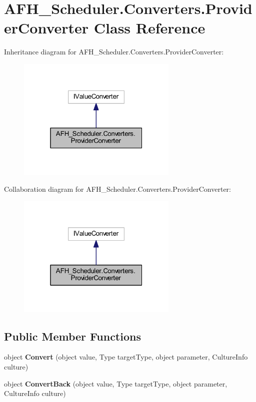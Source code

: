 \section{A\+F\+H\+\_\+\+Scheduler.\+Converters.\+Provider\+Converter Class Reference}
\label{class_a_f_h___scheduler_1_1_converters_1_1_provider_converter}


Inheritance diagram for A\+F\+H\+\_\+\+Scheduler.\+Converters.\+Provider\+Converter\+:
\nopagebreak
\begin{figure}[H]
\begin{center}
\leavevmode
\includegraphics[width=217pt]{class_a_f_h___scheduler_1_1_converters_1_1_provider_converter__inherit__graph}
\end{center}
\end{figure}


Collaboration diagram for A\+F\+H\+\_\+\+Scheduler.\+Converters.\+Provider\+Converter\+:
\nopagebreak
\begin{figure}[H]
\begin{center}
\leavevmode
\includegraphics[width=217pt]{class_a_f_h___scheduler_1_1_converters_1_1_provider_converter__coll__graph}
\end{center}
\end{figure}
\subsection*{Public Member Functions}
\begin{DoxyCompactItemize}
\item 
object \textbf{ Convert} (object value, Type target\+Type, object parameter, Culture\+Info culture)
\item 
object \textbf{ Convert\+Back} (object value, Type target\+Type, object parameter, Culture\+Info culture)
\end{DoxyCompactItemize}


